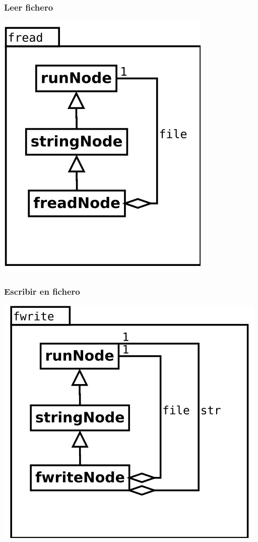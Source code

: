 \begin{multicols}{2}
   \subsubsection {Leer fichero} 
   \begin{center}
   \includegraphics[scale=0.4]{fread.png} \\
   \end{center}

   \subsubsection {Escribir en fichero} 
   \begin{center}
   \includegraphics[scale=0.4]{fwrite.png} \\
   \end{center}
\end{multicols}


